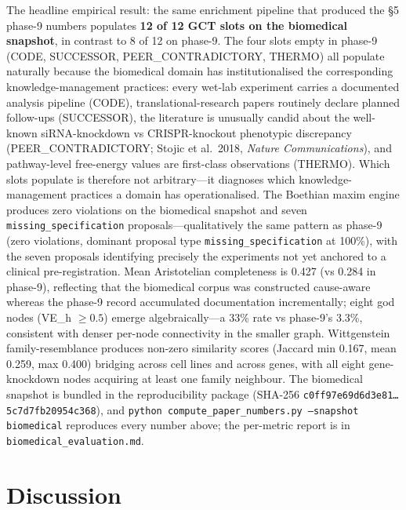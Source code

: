\documentclass{iosart2x}
\begin{document}
The headline empirical result: the same enrichment pipeline that produced the \S5 phase-9 numbers populates \textbf{12 of 12 GCT slots on the biomedical snapshot}, in contrast to 8 of 12 on phase-9. The four slots empty in phase-9 (CODE, SUCCESSOR, PEER\_CONTRADICTORY, THERMO) all populate naturally because the biomedical domain has institutionalised the corresponding knowledge-management practices: every wet-lab experiment carries a documented analysis pipeline (CODE), translational-research papers routinely declare planned follow-ups (SUCCESSOR), the literature is unusually candid about the well-known siRNA-knockdown vs CRISPR-knockout phenotypic discrepancy (PEER\_CONTRADICTORY; Stojic et al.\ 2018, \emph{Nature Communications}), and pathway-level free-energy values are first-class observations (THERMO). Which slots populate is therefore not arbitrary---it diagnoses which knowledge-management practices a domain has operationalised. The Boethian maxim engine produces zero violations on the biomedical snapshot and seven \texttt{missing\_specification} proposals---qualitatively the same pattern as phase-9 (zero violations, dominant proposal type \texttt{missing\_specification} at 100\%), with the seven proposals identifying precisely the experiments not yet anchored to a clinical pre-registration. Mean Aristotelian completeness is 0.427 (vs 0.284 in phase-9), reflecting that the biomedical corpus was constructed cause-aware whereas the phase-9 record accumulated documentation incrementally; eight god nodes (VE\_h $\geq 0.5$) emerge algebraically---a 33\% rate vs phase-9's 3.3\%, consistent with denser per-node connectivity in the smaller graph. Wittgenstein family-resemblance produces non-zero similarity scores (Jaccard min 0.167, mean 0.259, max 0.400) bridging across cell lines and across genes, with all eight gene-knockdown nodes acquiring at least one family neighbour. The biomedical snapshot is bundled in the reproducibility package (SHA-256 \texttt{c0ff97e69d6d3e81\ldots 5c7d7fb20954c368}), and \texttt{python compute\_paper\_numbers.py --snapshot biomedical} reproduces every number above; the per-metric report is in \texttt{biomedical\_evaluation.md}.

\section{Discussion}
\label{sec:discussion}
\end{document}

